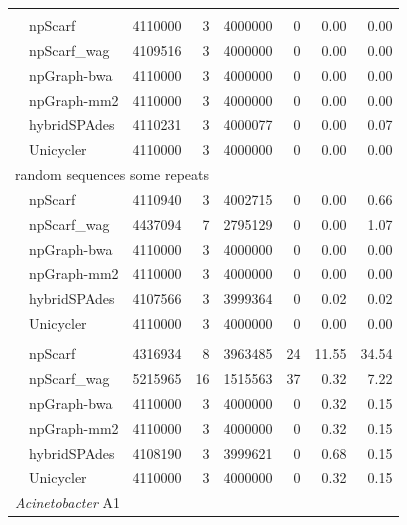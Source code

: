 \documentclass[10pt,letterpaper]{article}
\begin{document}
\begin{longtable}[!hpt]{llcrrrrr}
\rowcolor{Gray}
\multicolumn{8}{l}{random sequences no repeats} \\* %
\nobreakmidrule
\rowcolor{Gray}
& npScarf &  4110000 &  3  &  4000000  &  0  & 0.00  & 0.00\\*
\rowcolor{Gray}
& npScarf\_wag & 4109516  &  3  &  4000000  &  0  & 0.00  & 0.00\\*
\rowcolor{Gray}
& npGraph-bwa & 4110000  &  3  &  4000000  &  0  & 0.00  & 0.00\\*
\rowcolor{Gray}
& npGraph-mm2 & 4110000  &  3  &  4000000  &  0  & 0.00  & 0.00\\*
\rowcolor{Gray}
& hybridSPAdes & 4110231  &  3  & 4000077   &  0  & 0.00  &  0.07\\*
\rowcolor{Gray}
& Unicycler & 4110000  &  3  &  4000000  &  0  & 0.00  &  0.00\\
\hline
\multicolumn{8}{l}{random sequences some repeats} \\* %
\nobreakmidrule
& npScarf & 4110940  &  3  &  4002715  &  0  &  0.00 &  0.66\\*
& npScarf\_wag & 4437094  &  7 &  2795129  &  0  &  0.00 &  1.07\\*
& npGraph-bwa & 4110000  &  3  &  4000000  &  0 &  0.00 &  0.00\\*
& npGraph-mm2 &  4110000 &  3  &   4000000 & 0  & 0.00  &  0.00\\*
& hybridSPAdes & 4107566  &  3  &  3999364  &  0  & 0.02  & 0.02\\*
& Unicycler &  4110000 &  3 & 4000000  &  0 & 0.00  &  0.00\\
\hline
\rowcolor{Gray}
\multicolumn{8}{l}{random sequences many repeats} \\* %
\nobreakmidrule
\rowcolor{Gray}
& npScarf &  4316934 &  8  &  3963485  &  24  & 11.55  & 34.54\\*
\rowcolor{Gray}
& npScarf\_wag &  5215965 &  16  &  1515563  &  37  & 0.32  & 7.22\\*
\rowcolor{Gray}
& npGraph-bwa & 4110000  &  3  &  4000000  &  0  &  0.32 & 0.15\\*
\rowcolor{Gray}
& npGraph-mm2 &  4110000 &  3  &  4000000  &  0  & 0.32  & 0.15\\*
\rowcolor{Gray}
& hybridSPAdes & 4108190  &  3  &  3999621  &  0  &  0.68 &  0.15\\*
\rowcolor{Gray}
& Unicycler & 4110000  &  3  &  4000000  &  0  &  0.32  & 0.15  \\
\hline
\multicolumn{8}{l}{\emph{Acinetobacter} A1} \\* %

\end{longtable}
\end{document}
